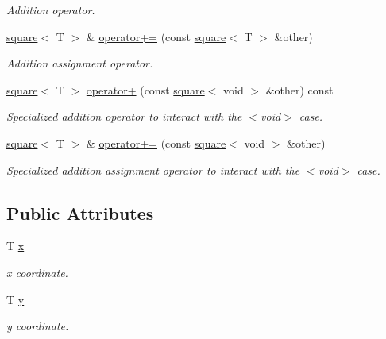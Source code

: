 \begin{DoxyCompactItemize}
\begin{DoxyCompactList}\small\item\em Addition operator. \end{DoxyCompactList}\item 
\mbox{\label{structsquare_a449426e468a40af9fbc7a06128553ba1}} 
\hyperlink{structsquare}{square}$<$ T $>$ \& \hyperlink{structsquare_a449426e468a40af9fbc7a06128553ba1}{operator+=} (const \hyperlink{structsquare}{square}$<$ T $>$ \&other)
\begin{DoxyCompactList}\small\item\em Addition assignment operator. \end{DoxyCompactList}\item 
\mbox{\label{structsquare_a97346a468c39963d3c30ba2649bd10b8}} 
\hyperlink{structsquare}{square}$<$ T $>$ \hyperlink{structsquare_a97346a468c39963d3c30ba2649bd10b8}{operator+} (const \hyperlink{structsquare}{square}$<$ void $>$ \&other) const
\begin{DoxyCompactList}\small\item\em Specialized addition operator to interact with the $<$void$>$ case. \end{DoxyCompactList}\item 
\mbox{\label{structsquare_acbf660ad49decf4178fbf843a7912251}} 
\hyperlink{structsquare}{square}$<$ T $>$ \& \hyperlink{structsquare_acbf660ad49decf4178fbf843a7912251}{operator+=} (const \hyperlink{structsquare}{square}$<$ void $>$ \&other)
\begin{DoxyCompactList}\small\item\em Specialized addition assignment operator to interact with the $<$void$>$ case. \end{DoxyCompactList}\end{DoxyCompactItemize}
\subsection*{Public Attributes}
\begin{DoxyCompactItemize}
\item 
\mbox{\label{structsquare_a9a6e49424fdfad5fe4ce893bb57ba467}} 
T \hyperlink{structsquare_a9a6e49424fdfad5fe4ce893bb57ba467}{x}
\begin{DoxyCompactList}\small\item\em x coordinate. \end{DoxyCompactList}\item 
\mbox{\label{structsquare_a7b976f9389a2fc271a332b5014dfd1e9}} 
T \hyperlink{structsquare_a7b976f9389a2fc271a332b5014dfd1e9}{y}
\begin{DoxyCompactList}\small\item\em y coordinate. \end{DoxyCompactList}\end{DoxyCompactItemize}


